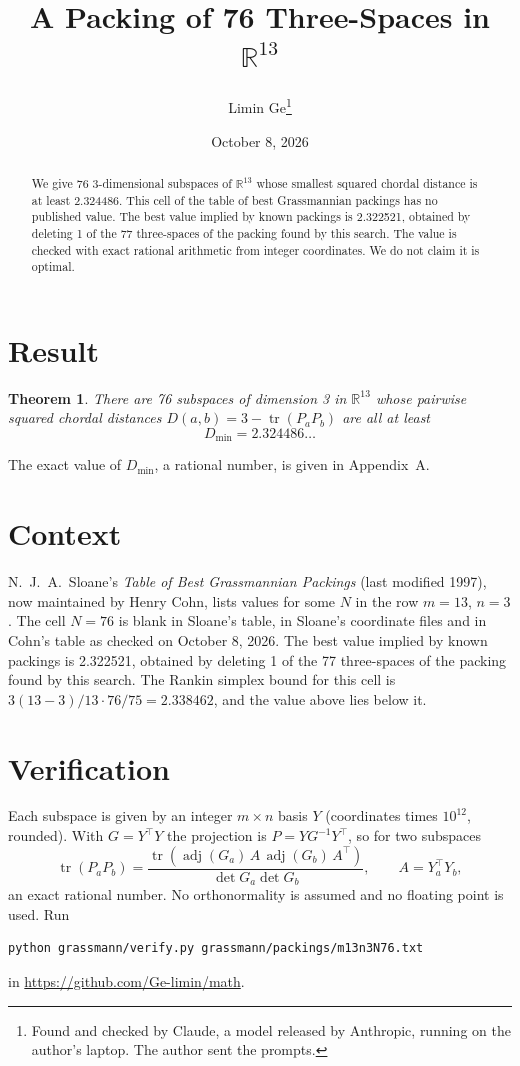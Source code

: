\documentclass[11pt,a4paper]{article}
\title{A Packing of 76 Three-Spaces in $\mathbb{R}^{13}$}
\author{Limin Ge\thanks{Found and checked by Claude, a model released by Anthropic, running on the author's laptop. The author sent the prompts.}}
\date{October 8, 2026}
\newtheorem*{theorem}{Theorem}
\begin{document}
\maketitle
\begin{abstract}
We give 76 3-dimensional subspaces of $\mathbb{R}^{13}$ whose smallest squared chordal distance is at least 2.324486. This cell of the table of best Grassmannian packings has no published value. The best value implied by known packings is 2.322521, obtained by deleting 1 of the 77 three-spaces of the packing found by this search. The value is checked with exact rational arithmetic from integer coordinates. We do not claim it is optimal.
\end{abstract}

\section{Result}
\begin{theorem}
There are 76 subspaces of dimension 3 in $\mathbb{R}^{13}$ whose pairwise squared chordal distances $D(a,b) = 3 - \operatorname{tr}(P_aP_b)$ are all at least
\[ D_{\min} = 2.324486\ldots \]
\end{theorem}
The exact value of $D_{\min}$, a rational number, is given in Appendix~A.


\section{Context}
N.~J.~A.~Sloane's \emph{Table of Best Grassmannian Packings} (last modified 1997), now maintained by Henry Cohn, lists values for some $N$ in the row $m=13$, $n=3$. The cell $N=76$ is blank in Sloane's table, in Sloane's coordinate files and in Cohn's table as checked on October 8, 2026. The best value implied by known packings is 2.322521, obtained by deleting 1 of the 77 three-spaces of the packing found by this search. The Rankin simplex bound for this cell is $3(13-3)/13\cdot 76/75 = 2.338462$, and the value above lies below it.


\section{Verification}
Each subspace is given by an integer $m\times n$ basis $Y$ (coordinates times $10^{12}$, rounded). With $G=Y^\top Y$ the projection is $P=YG^{-1}Y^\top$, so for two subspaces
\[ \operatorname{tr}(P_aP_b)=\frac{\operatorname{tr}(\operatorname{adj}(G_a)\,A\,\operatorname{adj}(G_b)\,A^\top)}{\det G_a\det G_b},\qquad A=Y_a^\top Y_b, \]
an exact rational number. No orthonormality is assumed and no floating point is used. Run
\begin{verbatim}
python grassmann/verify.py grassmann/packings/m13n3N76.txt
\end{verbatim}
in \url{https://github.com/Ge-limin/math}.
\end{document}
